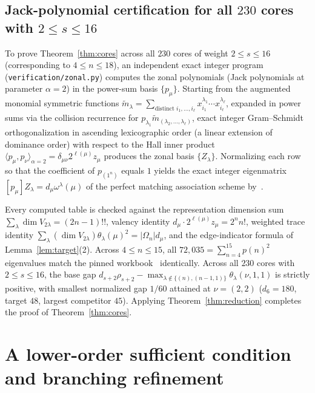 \documentclass[11pt]{article}
\theoremstyle{remark}
\begin{document}
\subsection{Jack-polynomial certification for all \texorpdfstring{$230$ cores with $2 \le s \le 16$}{230 cores with 2 <= s <= 16}}

To prove Theorem~\ref{thm:cores} across all $230$ cores of weight
$2 \le s \le 16$ (corresponding to $4 \le n \le 18$), an independent exact
integer program (\texttt{verification/zonal.py}) computes the zonal polynomials
(Jack polynomials at parameter $\alpha = 2$) in the power-sum basis $\{p_\mu\}$.
Starting from the augmented monomial symmetric functions
$\tilde{m}_\lambda = \sum_{\text{distinct } i_1,\dots,i_\ell}
x_{i_1}^{\lambda_1} \cdots x_{i_\ell}^{\lambda_\ell}$, expanded in power sums
via the collision recurrence for $p_{\lambda_1} \tilde{m}_{(\lambda_2,\dots,\lambda_\ell)}$,
exact integer Gram--Schmidt orthogonalization in ascending lexicographic order
(a linear extension of dominance order) with respect to the Hall inner product
$\langle p_\mu, p_\nu \rangle_{\alpha=2} = \delta_{\mu\nu} 2^{\ell(\mu)} z_\mu$
produces the zonal basis $\{Z_\lambda\}$. Normalizing each row so that the
coefficient of $p_{(1^n)}$ equals $1$ yields the exact integer eigenmatrix
$[p_\mu] Z_\lambda = d_\mu \omega^\lambda(\mu)$ of the perfect matching
association scheme by~\cite[Theorem~2.2.1]{Lindzey}.

Every computed table is checked against the representation dimension sum
$\sum_\lambda \dim V_{2\lambda} = (2n-1)!!$, valency identity
$d_\mu \cdot 2^{\ell(\mu)} z_\mu = 2^n n!$, weighted trace identity
$\sum_\lambda (\dim V_{2\lambda}) \theta_\lambda(\mu)^2 = |\Omega_n| d_\mu$,
and the edge-indicator formula of Lemma~\ref{lem:target}(2). Across
$4 \le n \le 15$, all $72{,}035 = \sum_{n=4}^{15} p(n)^2$ eigenvalues match the
pinned workbook~\cite{GuptaRepo} identically. Across all $230$ cores with
$2 \le s \le 16$, the base gap $d_{s+2}\rho_{s+2} - \max_{\lambda \notin \{(n),(n-1,1)\}} \theta_\lambda(\nu, 1, 1)$
is strictly positive, with smallest normalized gap $1/60$ attained at
$\nu = (2, 2)$ ($d_6 = 180$, target $48$, largest competitor $45$). Applying
Theorem~\ref{thm:reduction} completes the proof of Theorem~\ref{thm:cores}.

\section{A lower-order sufficient condition and branching refinement}\label{sec:lower-order}
\end{document}
